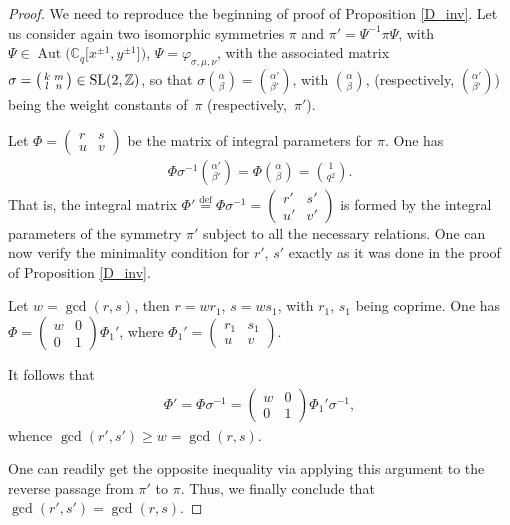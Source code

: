 \documentclass[pdftex]{sigma}
\numberwithin{equation}{section}
\begin{document}
\begin{proof} We need to reproduce the beginning of proof of Proposition \ref{D_inv}. Let us consider again two isomorphic symmetries $\pi$ and $\pi'=\Psi^{-1}\pi\Psi$, with $\Psi\in\operatorname{Aut}\big(\mathbb{C}_q\big[x^{\pm 1},y^{\pm 1}\big]\big)$, $\Psi=\varphi_{\sigma,\mu,\nu}$, with the associated matrix $\sigma=\left(\begin{smallmatrix}k & m\\ l & n\end{smallmatrix}\right)\in {\rm SL}(2,\mathbb{Z})$, so that $\sigma\binom\alpha\beta=\binom{\alpha'}{\beta'}$, with $\binom\alpha\beta$, (respectively, $\binom{\alpha'}{\beta'}$) being the weight constants of~$\pi$ (respectively,~$\pi'$).

Let $\Phi=\left(\begin{smallmatrix}r & s\\ u & v\end{smallmatrix}\right)$ be the matrix of integral parameters for $\pi$. One has
\begin{gather*}
\Phi\sigma^{-1}\binom{\alpha'}{\beta'}=\Phi\binom\alpha\beta=\binom{1}{q^2}.
\end{gather*}
That is, the integral matrix $\Phi'\stackrel{\mathrm{def}}{=}\Phi\sigma^{-1}=\left(\begin{smallmatrix}r' & s'\\ u' & v'\end{smallmatrix}\right)$ is formed by the integral parameters of the symmetry $\pi'$ subject to all the necessary relations. One can now verify the minimality condition for $r'$, $s'$ exactly as it was done in the proof of Proposition \ref{D_inv}.

Let $w=\operatorname{gcd}(r,s)$, then $r=wr_1$, $s=ws_1$, with $r_1$, $s_1$ being coprime. One has $\Phi=\left(\begin{smallmatrix}w & 0\\ 0 & 1\end{smallmatrix}\right)\Phi_1'$, where $\Phi_1'=\left(\begin{smallmatrix}r_1 & s_1\\ u & v\end{smallmatrix}\right)$.

It follows that
\begin{gather*}
\Phi'=\Phi\sigma^{-1}=\begin{pmatrix}w & 0\\ 0 & 1\end{pmatrix}\Phi_1'\sigma^{-1},
\end{gather*}
whence $\operatorname{gcd}(r',s')\ge w=\operatorname{gcd}(r,s)$.

One can readily get the opposite inequality via applying this argument to the reverse passage from $\pi'$ to $\pi$. Thus, we finally conclude that $\operatorname{gcd}(r',s')=\operatorname{gcd}(r,s)$.
\end{proof}
\end{document}
